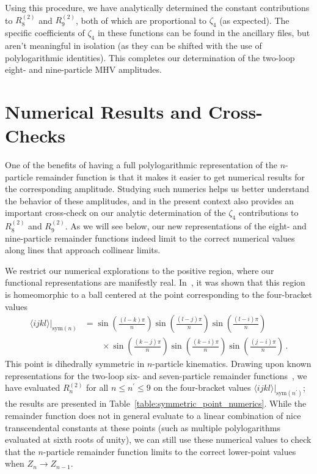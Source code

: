 \documentclass[11pt]{article}
\begin{document}
Using this procedure, we have analytically determined the constant contributions to $R_8^{(2)}$\! and $R_9^{(2)}$\!, both of which are proportional to $\zeta_4$ (as expected). The specific coefficients of $\zeta_4$ in these functions can be found in the ancillary files, but aren't meaningful in isolation (as they can be shifted with the use of polylogarithmic identities). This completes our determination of the two-loop eight- and nine-particle MHV amplitudes.


\section{Numerical Results and Cross-Checks}

One of the benefits of having a full polylogarithmic representation of the $n$-particle remainder function is that it makes it easier to get numerical results for the corresponding amplitude. Studying such numerics helps us better understand the behavior of these amplitudes, and in the present context also provides an important cross-check on our analytic determination of the $\zeta_4$ contributions to $R_8^{(2)}$\! and $R_9^{(2)}$\!. As we will see below, our new representations of the eight- and nine-particle remainder functions indeed limit to the correct numerical values along lines that approach collinear limits.

We restrict our numerical explorations to the positive region, where our functional representations are manifestly real. In~\cite{Galashin:2017onl}, it was shown that this region is homeomorphic to a ball centered at the point corresponding to the four-bracket values
\begin{align}
\langle i j k l \rangle \big|_{\text{sym}(n)} &= \sin\left(\frac{(l - k) \pi}{n} \right) \sin\left(\frac{(l - j) \pi}{n} \right) \sin\left(\frac{(l - i) \pi}{n}\right) \nonumber \\
&\qquad \times \sin\left(\frac{(k - j) \pi}{n}\right) \sin\left(\frac{(k - i) \pi}{n}\right) \sin\left(\frac{(j - i) \pi}{n}\right) \, . \label{eq:symmetric_point}
\end{align}
This point is dihedrally symmetric in $n$-particle kinematics. Drawing upon known representations for the two-loop six- and seven-particle remainder functions~\cite{DelDuca:2009au,DelDuca:2010zg,Goncharov:2010jf,Golden:2014xqf}, we have evaluated $R_n^{(2)}$ for all $n \leq n^\prime \leq 9$ on the four-bracket values $\langle i j k l \rangle \big|_{\text{sym}(n^\prime)}$; the results are presented in Table~\ref{table:symmetric_point_numerics}. While the  remainder function does not in general evaluate to a linear combination of nice transcendental constants at these points (such as multiple polylogarithms evaluated at sixth roots of unity), we can still use these numerical values to check that the $n$-particle remainder function limits to the correct lower-point values when $Z_n \to Z_{n-1}$. 
\end{document}
